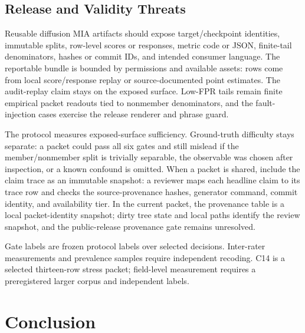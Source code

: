 \documentclass[10pt,conference]{IEEEtran}
\begin{document}
\subsection{Release and Validity Threats}

Reusable diffusion MIA artifacts should expose target/checkpoint identities,
immutable splits, row-level scores or responses, metric code or JSON,
finite-tail denominators, hashes or commit IDs, and intended consumer language.
The reportable bundle is bounded by permissions and available assets: rows come
from local score/response replay or source-documented point estimates. The
audit-replay claim stays on the exposed surface. Low-FPR tails remain finite
empirical packet readouts tied to nonmember denominators, and the
fault-injection cases exercise the release renderer and phrase guard.

The protocol measures exposed-surface sufficiency. Ground-truth difficulty stays
separate: a packet could pass all six gates and still mislead if the
member/nonmember split is trivially separable, the observable was chosen after
inspection, or a known confound is omitted.
When a packet is shared, include the claim trace as an immutable snapshot: a
reviewer maps each headline claim to its trace row and checks the source-provenance
hashes, generator command, commit identity, and availability tier. In the
current packet, the provenance table is a local packet-identity snapshot; dirty
tree state and local paths identify the review snapshot, and the public-release
provenance gate remains unresolved.

Gate labels are frozen protocol labels over selected decisions. Inter-rater
measurements and prevalence samples require independent recoding. C14 is a
selected thirteen-row stress packet; field-level measurement requires a
preregistered larger corpus and independent labels.

\section{Conclusion}
\end{document}
